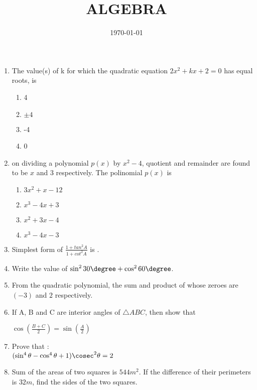 \documentclass[12pt]{article}
\begin{document}
	\title{ALGEBRA}
\date{ \today}
\maketitle
\begin{enumerate}
		\section*{ALGEBRA CBSE - 10}
\item
        The value(s) of k for which the quadratic equation $2x^2 + kx + 2 = 0$ has equal roots, is 
\begin{enumerate}
\item 4 
\item $\pm 4$
\item -4 
\item 0 
\end{enumerate}

\item 
	on dividing a polynomial $p(x)$ by $x^2 - 4$, 
quotient and remainder are found to be $x$ and $3$ 
respectively. The polinomial $p(x)$ is 
\begin{enumerate}
\item $3x^2 + x - 12$
\item $x^3 - 4x + 3$
\item $x^2 + 3x - 4$
\item $x^3 - 4x - 3$
\end{enumerate}

\item 
	Simplest form of $\frac{1 + tan^2 A}{1 + cot^2 A}$ is \underline{\hspace{2cm}}.

\item 
	Write the value of $\sin^2 30\degree + \cos^2 60\degree$.

\item
	From the quadratic polynomial, the sum and product  of whose zeroes are $(-3)$ and $2$ respectively.

\item 
	If A, B and C are interior angles of $ \triangle ABC$, then show that
	
	$\cos \left(\frac{B + C}{2}\right)=\sin \left(\frac{A}{2}\right)$
      
\item Prove that : \\
        $(\sin^4\theta - \cos^4\theta + 1)\cosec^2\theta = 2$
  
\item
	Sum of the areas of two squares is $544 m^2$. If the difference of their
perimeters is $32 m$, find the sides of the two squares.


\end{enumerate}
\end{document}
